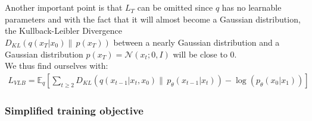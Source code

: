 \documentclass{article}
\begin{document}
\\\\
Another important point is that $L_T$ can be omitted since $q$ has no learnable parameters and with the fact that it will almost become a Gaussian distribution, the Kullback-Leibler Divergence \\
$D_{KL}\left(q\left(x_T | x_0\right) \| \, p\left(x_T\right)\right)$ between a nearly Gaussian distribution and a Gaussian distribution $p\left(x_T\right) = \mathcal{N}\left(x_t; 0, I\right)$ will be close to 0. \cite{ho2020denoising} \\
We thus find ourselves with:
\begin{gather}
  L_{VLB} = \mathbb{E}_q \left[ \sum_{t \geq 2} D_{KL}\left(q\left(x_{t-1} | x_t, x_0\right) \| \, p_{\theta}\left(x_{t-1} | x_t\right)\right) - \log\left(p_{\theta}\left(x_0 | x_1\right)\right) \right]
\end{gather}

\subsubsection{Simplified training objective}
\end{document}
